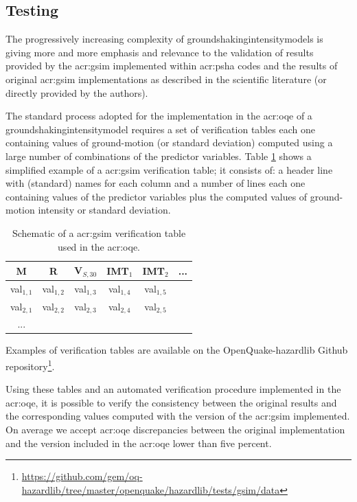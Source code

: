 \subsection{Testing}
%
The progressively increasing complexity of 
\glspl{groundshakingintensitymodel}
is giving more and more emphasis and relevance to the validation 
of results provided by the \gls{acr:gsim} implemented within 
\gls{acr:psha} codes and the results of original \gls{acr:gsim} 
implementations as described in the scientific literature 
(or directly provided by the authors).

The standard process adopted for the implementation in the 
\gls{acr:oqe} of a \gls{groundshakingintensitymodel} requires a 
set of verification tables each one containing values of 
ground-motion (or standard deviation) computed using a large 
number of combinations of the predictor variables. 
%
Table \ref{tab:verification} shows a simplified example of a 
\gls{acr:gsim} verification table; it consists of: a header 
line with (standard) names for each column and a number
of lines each one containing values of the predictor variables
plus the computed values of ground-motion intensity or standard
deviation.
\begin{table}[!ht]
\centering
\caption{Schematic of a \gls{acr:gsim} verification table used in the 
\gls{acr:oqe}.}
\begin{tabular}{|cccccc|}
\hline
\rowcolor{anti-flashwhite}
M & R & V$_{S,30}$ & IMT$_1$ & IMT$_2$ & ... \\
\hline 
val$_{1,1}$ & val$_{1,2}$ & val$_{1,3}$ & val$_{1,4}$ & val$_{1,5}$ & \\
val$_{2,1}$ & val$_{2,2}$ & val$_{2,3}$ & val$_{2,4}$ & val$_{2,5}$ & \\
... & & & & & \\
\hline
\end{tabular}
\label{tab:verification}
\end{table}
Examples of verification tables are available on the OpenQuake-hazardlib Github
repository\footnote{
\href{https://github.com/gem/oq-hazardlib/tree/master/openquake/hazardlib/tests/gsim/data}{
https://github.com/gem/oq-hazardlib/tree/master/openquake/hazardlib/tests/gsim/data}
}.

Using these tables and an automated verification procedure implemented
in the \gls{acr:oqe}, it is possible to verify the consistency between 
the original results and the corresponding values computed with the 
version of the \gls{acr:gsim} implemented. 
%
On average we accept \gls{acr:oqe} discrepancies between the original
implementation and the version included in the \gls{acr:oqe} lower than five
percent.

